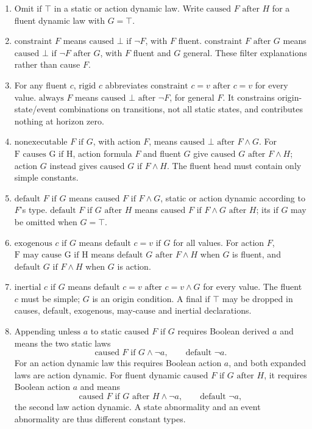 \begin{enumerate}
\item Omit \(\text{if }\top\) in a static or action dynamic law.
Write \(\text{caused }F\text{ after }H\) for a fluent dynamic law
with \(G=\top\).
\item \(\text{constraint }F\) means
\(\text{caused }\bot\text{ if }\neg F\), with \(F\) fluent.
\(\text{constraint }F\text{ after }G\) means
\(\text{caused }\bot\text{ if }\neg F\text{ after }G\),
with \(F\) fluent and \(G\) general.
These filter explanations rather than cause \(F\).
\item For any fluent \(c\), \(\text{rigid }c\) abbreviates
\(\text{constraint }c=v\text{ after }c=v\) for every value.
\(\text{always }F\) means
\(\text{caused }\bot\text{ after }\neg F\), for general \(F\).
It constrains origin-state/event combinations on transitions, not
all static states, and contributes nothing at horizon zero.
\item \(\text{nonexecutable }F\text{ if }G\), with action \(F\),
means \(\text{caused }\bot\text{ after }F\land G\).
For \(\text{F causes G if H}\), action formula \(F\) and fluent \(G\)
give \(\text{caused }G\text{ after }F\land H\);
action \(G\) instead gives \(\text{caused }G\text{ if }F\land H\).
The fluent head must contain only simple constants.
\item \(\text{default }F\text{ if }G\) means
\(\text{caused }F\text{ if }F\land G\), static or action dynamic
according to \(F\)'s type.
\(\text{default }F\text{ if }G\text{ after }H\) means
\(\text{caused }F\text{ if }F\land G\text{ after }H\);
its \(\text{if }G\) may be omitted when \(G=\top\).
\item \(\text{exogenous }c\text{ if }G\) means
\(\text{default }c=v\text{ if }G\) for all values.
For action \(F\), \(\text{F may cause G if H}\) means
\(\text{default }G\text{ after }F\land H\) when \(G\) is fluent,
and \(\text{default }G\text{ if }F\land H\) when \(G\) is action.
\item \(\text{inertial }c\text{ if }G\) means
\(\text{default }c=v\text{ after }c=v\land G\) for every value.
The fluent \(c\) must be simple; \(G\) is an origin condition.
A final \(\text{if }\top\) may be dropped in causes, default,
exogenous, may-cause and inertial declarations.
\item Appending \(\text{unless }a\) to static
\(\text{caused }F\text{ if }G\) requires Boolean derived \(a\)
and means the two static laws
\[
 \text{caused }F\text{ if }G\land\neg a,\qquad\text{default }\neg a.
\]
For an action dynamic law this requires Boolean action \(a\),
and both expanded laws are action dynamic.
For fluent dynamic \(\text{caused }F\text{ if }G\text{ after }H\),
it requires Boolean action \(a\) and means
\[
 \text{caused }F\text{ if }G\text{ after }H\land\neg a,\qquad
 \text{default }\neg a,
\]
the second law action dynamic. A state abnormality and an event
abnormality are thus different constant types.
\end{enumerate}

